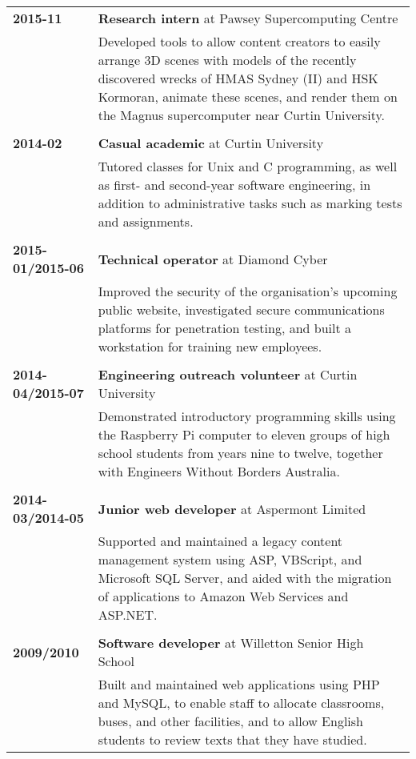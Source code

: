 \documentclass[a4paper,12pt]{article}
\begin{document}
\begin{tabular}{p{3.5cm}p{12.5cm}}
	\textbf{2015-11} &
		\textbf{Research intern} at Pawsey Supercomputing Centre\\ &
		Developed tools to allow content creators to easily arrange 3D
		scenes with models of the recently discovered wrecks of HMAS
		Sydney (II) and HSK Kormoran, animate these scenes, and render
		them on the Magnus supercomputer near Curtin University.\\\\
	\textbf{2014-02} &
		\textbf{Casual academic} at Curtin University\\ &
		Tutored classes for Unix and C programming, as well as
		first- and second-year software engineering, in
		addition to administrative tasks such as marking tests
		and assignments.\\\\
	\textbf{2015-01/2015-06} &
		\textbf{Technical operator} at Diamond Cyber\\ &
		Improved the security of the organisation's upcoming public
		website, investigated secure communications platforms for
		penetration testing, and built a workstation for training new
		employees.\\\\
	\textbf{2014-04/2015-07} &
		\textbf{Engineering outreach volunteer} at Curtin University\\ &
		Demonstrated introductory programming skills using the
		Raspberry Pi computer to eleven groups of high school students
		from years nine to twelve, together with Engineers Without
		Borders Australia.\\\\
	\textbf{2014-03/2014-05} &
		\textbf{Junior web developer} at Aspermont Limited\\ &
		Supported and maintained a legacy content management system
		using ASP, VBScript, and Microsoft SQL Server, and aided
		with the migration of applications to Amazon Web Services and
		ASP.NET.\\\\
	\textbf{2009/2010} &
		\textbf{Software developer} at Willetton Senior High School\\ &
		Built and maintained web applications using PHP and MySQL, to
		enable staff to allocate classrooms, buses, and other
		facilities, and to allow English students to review texts that
		they have studied.\\
\end{tabular}
\end{document}
